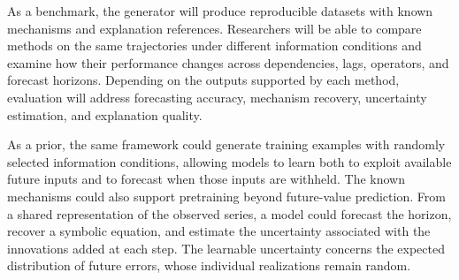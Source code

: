 As a benchmark, the generator will produce reproducible datasets with known
mechanisms and explanation references. Researchers will be able to compare
methods on the same trajectories under different information conditions and
examine how their performance changes across dependencies, lags, operators,
and forecast horizons. Depending on the outputs supported by each method,
evaluation will address forecasting accuracy, mechanism recovery, uncertainty
estimation, and explanation quality.

As a prior, the same framework could generate training examples with randomly
selected information conditions, allowing models to learn both to exploit
available future inputs and to forecast when those inputs are withheld. The
known mechanisms could also support pretraining beyond future-value
prediction. From a shared representation of the observed series, a model could
forecast the horizon, recover a symbolic equation, and estimate the
uncertainty associated with the innovations added at each step. The learnable
uncertainty concerns the expected distribution of future errors, whose
individual realizations remain random.

